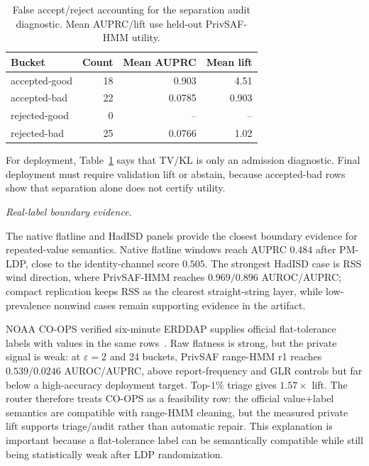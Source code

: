 \documentclass[conference]{IEEEtran}
\begin{document}
\begin{table}[t]
\centering
\caption{False accept/reject accounting for the separation audit diagnostic. Mean AUPRC/lift use held-out PrivSAF-HMM utility.}
\label{tab:false_accept}
\scriptsize
\begin{tabular}{lrrr}
\toprule
Bucket & Count & Mean AUPRC & Mean lift \\
\midrule
accepted-good & 18 & 0.903 & 4.51 \\
accepted-bad & 22 & 0.0785 & 0.903 \\
rejected-good & 0 & -- & -- \\
rejected-bad & 25 & 0.0766 & 1.02 \\
\bottomrule
\end{tabular}
\end{table}

For deployment, Table~\ref{tab:false_accept} says that TV/KL is only an admission diagnostic. Final deployment must require validation lift or abstain, because accepted-bad rows show that separation alone does not certify utility.

\noindent\emph{Real-label boundary evidence.}
\label{ssec:acceptability_extensions}

The native flatline and HadISD panels provide the closest boundary evidence for repeated-value semantics. Native flatline windows reach AUPRC \(0.484\) after PM-LDP, close to the identity-channel score \(0.505\). The strongest HadISD case is RSS wind direction, where PrivSAF-HMM reaches \(0.969/0.896\) AUROC/AUPRC; compact replication keeps RSS as the clearest straight-string layer, while low-prevalence nonwind cases remain supporting evidence in the artifact.

NOAA CO-OPS verified six-minute ERDDAP supplies official flat-tolerance labels with values in the same rows~\cite{noaa_coops_verified_erddap,noaa_coops_qc_requirements}. Raw flatness is strong, but the private signal is weak: at \(\varepsilon=2\) and 24 buckets, PrivSAF range-HMM r1 reaches \(0.539/0.0246\) AUROC/AUPRC, above report-frequency and GLR controls but far below a high-accuracy deployment target. Top-\(1\%\) triage gives \(1.57\times\) lift. The router therefore treats CO-OPS as a feasibility row: the official value+label semantics are compatible with range-HMM cleaning, but the measured private lift supports triage/audit rather than automatic repair. This explanation is important because a flat-tolerance label can be semantically compatible while still being statistically weak after LDP randomization.
\end{document}
